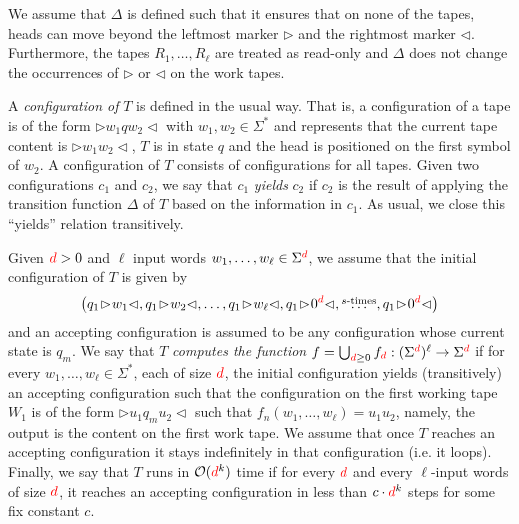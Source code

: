 We assume that $\Delta$ is defined such that it ensures that on none of the tapes, heads can move beyond 
the leftmost marker $\rhd$ and the rightmost marker $\lhd$. Furthermore, the tapes $R_1,\ldots,R_\ell$ are treated as read-only and $\Delta$ does not change the 
occurrences of $\rhd$ or $\lhd$ on the work tapes.

A \textit{configuration of} $T$ is defined in the usual way. That is, a configuration of a tape is of the form
$\rhd w_1qw_2\lhd$ with $w_1,w_2\in\Sigma^*$ and represents that the current tape content is 
$\rhd w_1w_2\lhd$, $T$ is in state $q$ and the head is positioned on the first symbol of $w_2$. 
A configuration of $T$ consists of configurations for all tapes. Given two configurations 
$c_1$ and $c_2$, we say that $c_1$ \textit{yields} $c_2$ if $c_2$ is the result of applying the transition 
function $\Delta$ of $T$ based on the information in $c_1$. As usual, we close this ``yields'' relation 
transitively.

Given ${\color{red} d} > 0$ and $\ell$ input words $w_1,\ldots,w_\ell\in\Sigma^{{\color{red} d}}$, we assume that the initial configuration of 
$T$ is given by
$$
\bigl(q_1 \!\rhd\! w_1\lhd,q_1\!\rhd\! w_2\lhd,\ldots, q_1\!\rhd\! w_\ell\lhd, q_1\!\rhd\! 0^\EDIT{d} \lhd, \overset{\text{$s$-times}}{\ldots}, q_1\!\rhd\! 0^\EDIT{d} \lhd \bigr)
$$ and an 
accepting configuration is assumed to be any configuration whose current state is $q_m$. We say that $T$ \textit{computes the function} $f=\bigcup_{{\color{red} d}\geq 0} f_{\color{red} d}:(\Sigma^{\color{red} d})^\ell\to\Sigma^{\color{red} d}$ if for every
$w_1,\ldots,w_\ell\in\Sigma^*$, each of size ${\color{red} d}$, the initial configuration yields (transitively) an accepting 
configuration such that the configuration on the first working tape $W_1$ is of the form $\rhd u_1 q_m u_2\lhd$ such that $f_n(w_1,\ldots,w_\ell) = u_1u_2$, namely, the output is the content on the first work tape. 
We assume that once $T$ reaches an accepting configuration it stays indefinitely in that configuration 
(i.e. it loops).
Finally, we say that $T$ runs in $\mathcal{O}({\color{red} d}^{k})$ time if for every ${\color{red} d}$ and every $\ell$-input words of size ${\color{red} d}$, it reaches an accepting configuration in less than $c\cdot {\color{red} d}^{k}$ steps for some fix constant $c$.




